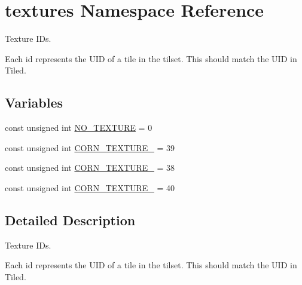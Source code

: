 \hypertarget{namespacetextures}{\section{textures Namespace Reference}
\label{namespacetextures}
}


Texture I\-Ds.

Each id represents the U\-I\-D of a tile in the tilset. This should match the U\-I\-D in Tiled.  


\subsection*{Variables}
\begin{DoxyCompactItemize}
\item 
const unsigned int \hyperlink{namespacetextures_a0441d01cbc4e61c26642f3ae2199ff01}{N\-O\-\_\-\-T\-E\-X\-T\-U\-R\-E} = 0
\item 
const unsigned int \hyperlink{namespacetextures_ad9d822633e938b097758d935dbf7addf}{C\-O\-R\-N\-\_\-\-T\-E\-X\-T\-U\-R\-E\-\_} = 39
\item 
const unsigned int \hyperlink{namespacetextures_a4ea11f59a0eb308393ca4a67d75d8e1d}{C\-O\-R\-N\-\_\-\-T\-E\-X\-T\-U\-R\-E\-\_} = 38
\item 
const unsigned int \hyperlink{namespacetextures_a1b3b07f0dfd7b82f409765d6153bc641}{C\-O\-R\-N\-\_\-\-T\-E\-X\-T\-U\-R\-E\-\_} = 40
\end{DoxyCompactItemize}


\subsection{Detailed Description}
Texture I\-Ds.

Each id represents the U\-I\-D of a tile in the tilset. This should match the U\-I\-D in Tiled. 


